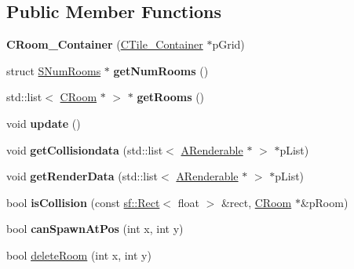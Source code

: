 \subsection*{Public Member Functions}
\begin{DoxyCompactItemize}
\item 
\hypertarget{classCRoom__Container_a8ff9ed6e36687810fa9d3e75f8be311e}{{\bfseries C\-Room\-\_\-\-Container} (\hyperlink{classCTile__Container}{C\-Tile\-\_\-\-Container} $\ast$p\-Grid)}\label{classCRoom__Container_a8ff9ed6e36687810fa9d3e75f8be311e}

\item 
\hypertarget{classCRoom__Container_a82aafa14e115d22530fbc70f88c5a224}{struct \hyperlink{structSNumRooms}{S\-Num\-Rooms} $\ast$ {\bfseries get\-Num\-Rooms} ()}\label{classCRoom__Container_a82aafa14e115d22530fbc70f88c5a224}

\item 
\hypertarget{classCRoom__Container_ad24e32e7fba1122db0c40aea2aeb0da2}{std\-::list$<$ \hyperlink{classCRoom}{C\-Room} $\ast$ $>$ $\ast$ {\bfseries get\-Rooms} ()}\label{classCRoom__Container_ad24e32e7fba1122db0c40aea2aeb0da2}

\item 
\hypertarget{classCRoom__Container_a976c43bd83d5416c3f3d286d09ebf89d}{void {\bfseries update} ()}\label{classCRoom__Container_a976c43bd83d5416c3f3d286d09ebf89d}

\item 
\hypertarget{classCRoom__Container_a3aba6f3bd0674392426bb68b07f3bd2f}{void {\bfseries get\-Collisiondata} (std\-::list$<$ \hyperlink{classARenderable}{A\-Renderable} $\ast$ $>$ $\ast$p\-List)}\label{classCRoom__Container_a3aba6f3bd0674392426bb68b07f3bd2f}

\item 
\hypertarget{classCRoom__Container_a15cce22d7e258ca05eaa0605263bd743}{void {\bfseries get\-Render\-Data} (std\-::list$<$ \hyperlink{classARenderable}{A\-Renderable} $\ast$ $>$ $\ast$p\-List)}\label{classCRoom__Container_a15cce22d7e258ca05eaa0605263bd743}

\item 
\hypertarget{classCRoom__Container_a2eb1c5bc2aef2804cb15cbedd5fc649a}{bool {\bfseries is\-Collision} (const \hyperlink{classsf_1_1Rect}{sf\-::\-Rect}$<$ float $>$ \&rect, \hyperlink{classCRoom}{C\-Room} $\ast$\&p\-Room)}\label{classCRoom__Container_a2eb1c5bc2aef2804cb15cbedd5fc649a}

\item 
\hypertarget{classCRoom__Container_a706efb0198fe6a811d5065fa4de6ff75}{bool {\bfseries can\-Spawn\-At\-Pos} (int x, int y)}\label{classCRoom__Container_a706efb0198fe6a811d5065fa4de6ff75}

\item 
bool \hyperlink{classCRoom__Container_a7bc2bd08133c964fe7e21fa579b075d3}{delete\-Room} (int x, int y)
\end{DoxyCompactItemize}


